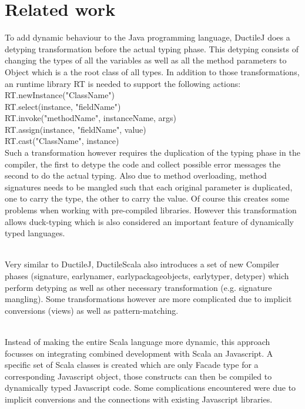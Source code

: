 \section{Related work}


To add dynamic behaviour to the Java programming language, DuctileJ does a detyping transformation before the actual typing phase. This detyping consists of changing the types of all the variables as well as all the method parameters to {\ttfamily Object} which is a the root class of all types. In addition to those transformations, an runtime library {\ttfamily RT} is needed to support the following actions:
{\ttfamily
RT.newInstance("ClassName")\\
RT.select(instance, "fieldName")\\
RT.invoke("methodName", instanceName, args)\\
RT.assign(instance, "fieldName", value)\\
RT.cast("ClassName", instance)\\	
}
Such a transformation however requires the duplication of the typing phase in the compiler, the first to detype the code and collect possible error messages the second to do the actual typing. Also due to method overloading, method signatures needs to be mangled such that each original parameter is duplicated, one to carry the type, the other to carry the value. Of course this creates some problems when working with pre-compiled libraries. However this transformation allows duck-typing which is also considered an important feature of dynamically typed languages.
\\
\\

Very similar to DuctileJ, DuctileScala also introduces a set of new Compiler phases ({\ttfamily signature, earlynamer, earlypackageobjects, earlytyper, detyper}) which perform detyping as well as other necessary transformation (e.g. signature mangling). Some transformations however are more complicated due to implicit conversions (views) as well as pattern-matching.
\\
\\

Instead of making the entire Scala language more dynamic, this approach focusses on integrating combined development with Scala an Javascript. A specific set of Scala classes is created which are only Facade type for a corresponding Javascript object, those constructs can then be compiled to dynamically typed Javascript code. Some complications encountered were due to implicit conversions and the connections with existing Javascript libraries.
\\
\\

